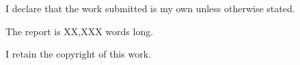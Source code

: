 


I declare that the work submitted is my own unless otherwise stated.

The report is XX,XXX words long.

I retain the copyright of this work. 


